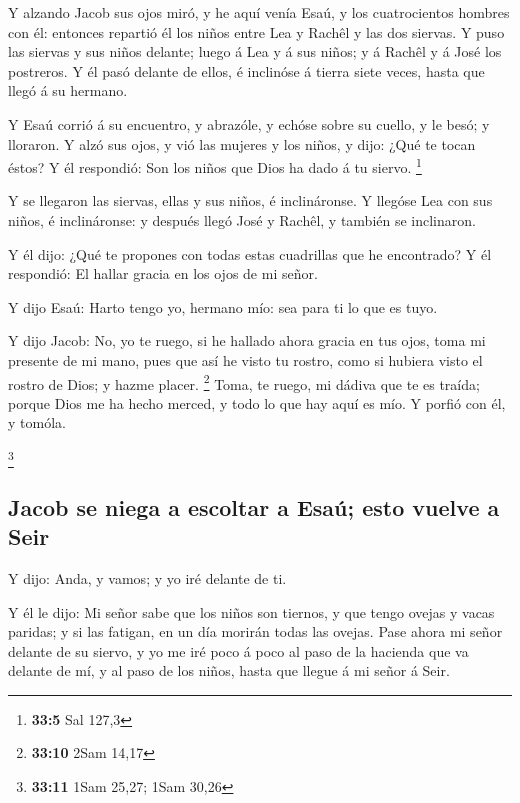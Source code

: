  Y alzando Jacob sus ojos miró, y he aquí venía Esaú, y
los cuatrocientos hombres con él: entonces repartió él los niños entre
Lea y Rachêl y las dos siervas.  Y puso las siervas y sus
niños delante; luego á Lea y á sus niños; y á Rachêl y á José los
postreros.  Y él pasó delante de ellos, é inclinóse á
tierra siete veces, hasta que llegó á su hermano.

 Y Esaú corrió á su encuentro, y abrazóle, y echóse sobre
su cuello, y le besó; y lloraron.  Y alzó sus ojos, y vió
las mujeres y los niños, y dijo: ¿Qué te tocan éstos? Y él respondió:
Son los niños que Dios ha dado á tu siervo. \footnote{\textbf{33:5} Sal
  127,3}

 Y se llegaron las siervas, ellas y sus niños, é
inclináronse.  Y llegóse Lea con sus niños, é
inclináronse: y después llegó José y Rachêl, y también se inclinaron.

 Y él dijo: ¿Qué te propones con todas estas cuadrillas
que he encontrado? Y él respondió: El hallar gracia en los ojos de mi
señor.

 Y dijo Esaú: Harto tengo yo, hermano mío: sea para ti lo
que es tuyo.

 Y dijo Jacob: No, yo te ruego, si he hallado ahora
gracia en tus ojos, toma mi presente de mi mano, pues que así he visto
tu rostro, como si hubiera visto el rostro de Dios; y hazme placer.
\footnote{\textbf{33:10} 2Sam 14,17}  Toma, te ruego, mi
dádiva que te es traída; porque Dios me ha hecho merced, y todo lo que
hay aquí es mío. Y porfió con él, y tomóla.

\footnote{\textbf{33:11} 1Sam 25,27; 1Sam 30,26}

\hypertarget{jacob-se-niega-a-escoltar-a-esauxfa-esto-vuelve-a-seir}{%
\subsection{Jacob se niega a escoltar a Esaú; esto vuelve a
Seir}\label{jacob-se-niega-a-escoltar-a-esauxfa-esto-vuelve-a-seir}}

 Y dijo: Anda, y vamos; y yo iré delante de ti.

 Y él le dijo: Mi señor sabe que los niños son tiernos, y
que tengo ovejas y vacas paridas; y si las fatigan, en un día morirán
todas las ovejas.  Pase ahora mi señor delante de su
siervo, y yo me iré poco á poco al paso de la hacienda que va delante de
mí, y al paso de los niños, hasta que llegue á mi señor á Seir.

